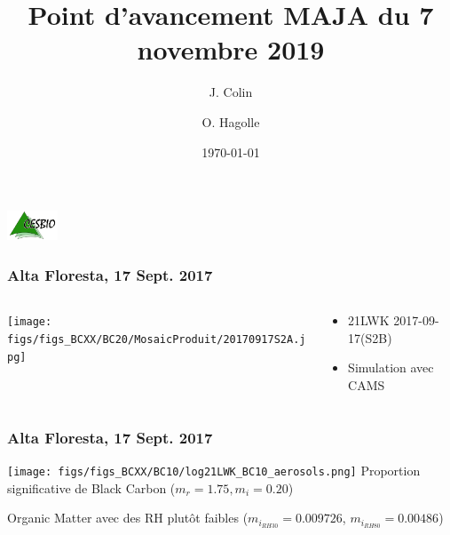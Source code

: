 \documentclass[8pt]{beamer}
\title{Point d'avancement MAJA du 7 novembre 2019}
\author{J. Colin\inst{1} \and O. Hagolle\inst{1}}%
\institute{\inst{1}Centre d'\'Etudes Spatiales de la Biosph\`ere, France \url{jerome.colin@cesbio.cnes.fr}\\
}
\date{\today} %
\begin{document}
{
	\begin{frame}
		\vspace{.8cm}
		\includegraphics[width=1.5cm]{logo_cesbio_transp.pdf}
	\titlepage %
	\end{frame}
}



\begin{frame}
\frametitle{Alta Floresta, 17 Sept. 2017}
	
	\begin{columns}
		\begin{column}{0.7\textwidth}
			\begin{center}
				
		     	\texttt{[image: figs/figs\_BCXX/BC20/MosaicProduit/20170917S2A.jpg]}
		    \end{center}		
		\end{column}
		\begin{column}{0.3\textwidth}
			\begin{center}
				\begin{itemize}
					\item 21LWK 2017-09-17(S2B)
					\item Simulation avec CAMS
				\end{itemize}
		    \end{center}		
		\end{column}
	\end{columns}
\end{frame}

\begin{frame}
\frametitle{Alta Floresta, 17 Sept. 2017}
	\texttt{[image: figs/figs\_BCXX/BC10/log21LWK\_BC10\_aerosols.png]}
	Proportion significative de Black Carbon ($m_{r}=1.75, m_{i}=0.20$)
	
	Organic Matter avec des RH plutôt faibles ($m_{i_{RH30}}=0.009726$, $m_{i_{RH80}}=0.00486$)
\end{frame}
\end{document}

